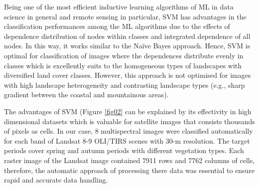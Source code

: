 \documentclass[preprint,12pt,authoryear]{elsarticle}
\begin{document}
Being one of the most efficient inductive learning algorithms of ML in data science in general and remote sensing in particular, SVM has advantages in the classification performances among the ML algorithms due to the effects of dependence distribution of nodes within classes and integrated dependence of all nodes. In this way, it works similar to the Naïve Bayes approach. Hence, SVM is optimal for classification of images where the dependences distribute evenly in classes which is excellently suits to the homogeneous types of landscapes with diversified land cover classes. However, this approach is not optimised for images with high landscape heterogeneity and contrasting landscape types (e.g., sharp gradient between the coastal and mountainous areas).

The advantages of SVM (Figure \ref{fig02} can be explained by its effectivity in high dimensional datasets which is valuable for satellite images that consists thousands of pixels as cells. In our case, 8 multispectral images were classified automatically for each band of Landsat 8-9 OLI/TIRS scenes with 30-m resolution. The target periods cover spring and autumn periods with different vegetation types. Each raster image of the Landsat image contained 7911 rows and 7762 columns of cells, therefore, the automatic approach of processing there data was essential to ensure rapid and accurate data handling. 
\end{document}

